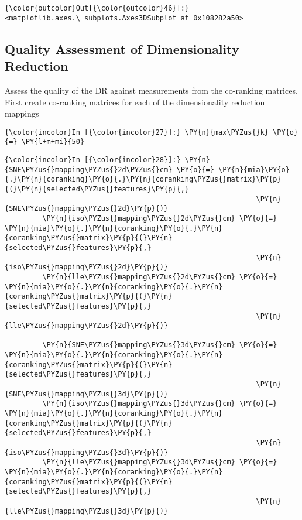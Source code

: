             \begin{Verbatim}[commandchars=\\\{\}]
{\color{outcolor}Out[{\color{outcolor}46}]:} <matplotlib.axes.\_subplots.Axes3DSubplot at 0x108282a50>
\end{Verbatim}

    \subsection{Quality Assessment of Dimensionality
Reduction}\label{quality-assessment-of-dimensionality-reduction}

    Assess the quality of the DR against measurements from the co-ranking
matrices. First create co-ranking matrices for each of the
dimensionality reduction mappings

    \begin{Verbatim}[commandchars=\\\{\}]
{\color{incolor}In [{\color{incolor}27}]:} \PY{n}{max\PYZus{}k} \PY{o}{=} \PY{l+m+mi}{50}
\end{Verbatim}

    \begin{Verbatim}[commandchars=\\\{\}]
{\color{incolor}In [{\color{incolor}28}]:} \PY{n}{SNE\PYZus{}mapping\PYZus{}2d\PYZus{}cm} \PY{o}{=} \PY{n}{mia}\PY{o}{.}\PY{n}{coranking}\PY{o}{.}\PY{n}{coranking\PYZus{}matrix}\PY{p}{(}\PY{n}{selected\PYZus{}features}\PY{p}{,}
                                                            \PY{n}{SNE\PYZus{}mapping\PYZus{}2d}\PY{p}{)}
         \PY{n}{iso\PYZus{}mapping\PYZus{}2d\PYZus{}cm} \PY{o}{=} \PY{n}{mia}\PY{o}{.}\PY{n}{coranking}\PY{o}{.}\PY{n}{coranking\PYZus{}matrix}\PY{p}{(}\PY{n}{selected\PYZus{}features}\PY{p}{,}
                                                            \PY{n}{iso\PYZus{}mapping\PYZus{}2d}\PY{p}{)}
         \PY{n}{lle\PYZus{}mapping\PYZus{}2d\PYZus{}cm} \PY{o}{=} \PY{n}{mia}\PY{o}{.}\PY{n}{coranking}\PY{o}{.}\PY{n}{coranking\PYZus{}matrix}\PY{p}{(}\PY{n}{selected\PYZus{}features}\PY{p}{,}
                                                            \PY{n}{lle\PYZus{}mapping\PYZus{}2d}\PY{p}{)}

         \PY{n}{SNE\PYZus{}mapping\PYZus{}3d\PYZus{}cm} \PY{o}{=} \PY{n}{mia}\PY{o}{.}\PY{n}{coranking}\PY{o}{.}\PY{n}{coranking\PYZus{}matrix}\PY{p}{(}\PY{n}{selected\PYZus{}features}\PY{p}{,}
                                                            \PY{n}{SNE\PYZus{}mapping\PYZus{}3d}\PY{p}{)}
         \PY{n}{iso\PYZus{}mapping\PYZus{}3d\PYZus{}cm} \PY{o}{=} \PY{n}{mia}\PY{o}{.}\PY{n}{coranking}\PY{o}{.}\PY{n}{coranking\PYZus{}matrix}\PY{p}{(}\PY{n}{selected\PYZus{}features}\PY{p}{,}
                                                            \PY{n}{iso\PYZus{}mapping\PYZus{}3d}\PY{p}{)}
         \PY{n}{lle\PYZus{}mapping\PYZus{}3d\PYZus{}cm} \PY{o}{=} \PY{n}{mia}\PY{o}{.}\PY{n}{coranking}\PY{o}{.}\PY{n}{coranking\PYZus{}matrix}\PY{p}{(}\PY{n}{selected\PYZus{}features}\PY{p}{,}
                                                            \PY{n}{lle\PYZus{}mapping\PYZus{}3d}\PY{p}{)}
\end{Verbatim}

